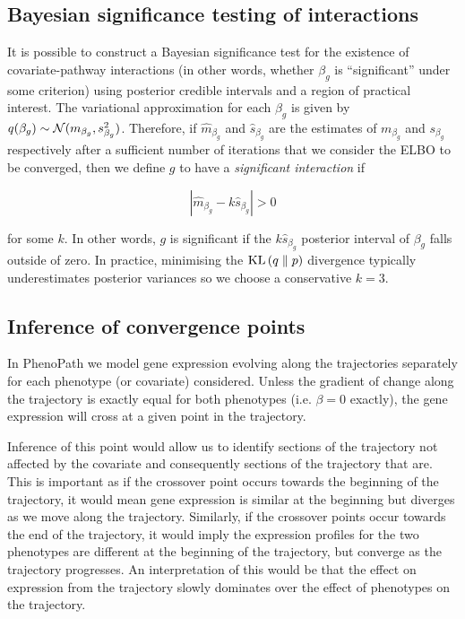 \subsection{Bayesian significance testing of interactions} \label{sec:sigtest}

It is possible to construct a Bayesian significance test for the existence of covariate-pathway interactions (in other words, whether $\beta_g$ is ``significant'' under some criterion) using posterior credible intervals and a region of practical interest. The variational approximation for each $\beta_g$ is given by $q(\beta_g) \sim \mathcal{N}(m_{\beta_g}, s^2_{\beta_g})$. Therefore, if $\hat{m}_{\beta_g}$ and $\hat{s}_{\beta_g}$ are the estimates of $m_{\beta_g}$ and $s_{\beta_g}$ respectively after a sufficient number of iterations that we consider the ELBO to be converged, then we define $g$ to have a \emph{significant interaction}
if

\begin{equation}
  | \hat{m}_{\beta_g} - k \hat{s}_{\beta_g} | > 0
\end{equation}

for some $k$. In other words, $g$ is significant if the $k \hat{s}_{\beta_g}$ posterior interval of $\beta_g$ falls outside of zero.  In practice, minimising the $\textrm{KL}\left(q\;\|\;p\right)$ divergence typically underestimates posterior variances \citep{blei2016variational} so we choose a conservative $k=3$.

\subsection{Inference of convergence points} \label{sec:crossover}

In PhenoPath we model gene expression evolving along the trajectories separately for each phenotype (or covariate) considered. Unless the gradient of change along the trajectory is exactly equal for both phenotypes (i.e. $\beta = 0$ exactly), the gene expression will cross at a given point in the trajectory.

Inference of this point would allow us to identify sections of the trajectory not affected by the covariate and consequently sections of the trajectory that are. This is important as if the crossover point occurs towards the beginning of the trajectory, it would mean gene expression is similar at the beginning but diverges as we move along the trajectory. Similarly, if the crossover points occur towards the end of the trajectory, it would imply the expression profiles for the two phenotypes are different at the beginning of the trajectory, but converge as the trajectory progresses. An interpretation of this would be that the effect on expression from the trajectory slowly dominates over the effect of phenotypes on the trajectory.

